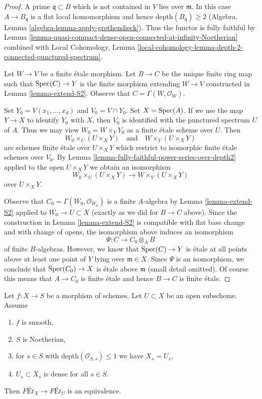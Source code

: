\begin{proof}
A prime $\mathfrak q \subset B$ which is not contained in $V$
lies over $\mathfrak m$. In this case $A \to B_\mathfrak q$
is a flat local homomorphism and hence $\text{depth}(B_\mathfrak q) \geq 2$
(Algebra, Lemma \ref{algebra-lemma-apply-grothendieck}).
Thus the functor is fully faithful by
Lemma \ref{lemma-quasi-compact-dense-open-connected-at-infinity-Noetherian}
combined with Local Cohomology,
Lemma \ref{local-cohomology-lemma-depth-2-connected-punctured-spectrum}.

\medskip\noindent
Let $W \to V$ be a finite \'etale morphism. Let $B \to C$ be the unique finite
ring map such that $\mathop{\mathrm{Spec}}(C) \to Y$ is the finite morphism extending
$W \to V$ constructed in Lemma \ref{lemma-extend-S2}.
Observe that $C = \Gamma(W, \mathcal{O}_W)$.

\medskip\noindent
Set $Y_0 = V(x_1, \ldots, x_d)$ and $V_0 = V \cap Y_0$. Set $X = \mathop{\mathrm{Spec}}(A)$.
If we use the map $Y \to X$ to identify $Y_0$ with $X$,
then $V_0$ is identified with the punctured spectrum $U$ of $A$.
Thus we may view $W_0 = W \times_Y Y_0$ as a finite \'etale scheme
over $U$. Then
$$
W_0 \times_U (U \times_X Y)
\quad\text{and}\quad
W \times_V (U \times_X Y)
$$
are schemes finite \'etale over $U \times_X Y$ which restrict to
isomorphic finite \'etale schemes over $V_0$. By
Lemma \ref{lemma-fully-faithful-power-series-over-depth2}
applied to the open $U \times_X Y$ we obtain an isomorphism
$$
W_0 \times_U (U \times_X Y) \longrightarrow W \times_V (U \times_X Y)
$$
over $U \times_X Y$.

\medskip\noindent
Observe that $C_0 = \Gamma(W_0, \mathcal{O}_{W_0})$ is a finite $A$-algebra
by Lemma \ref{lemma-extend-S2} applied to $W_0 \to U \subset X$ (exactly
as we did for $B \to C$ above). Since the construction in
Lemma \ref{lemma-extend-S2} is compatible with flat base change
and with change of opens, the isomorphism above induces
an isomorphism
$$
\Psi : C \longrightarrow C_0 \otimes_A B
$$
of finite $B$-algebras. However, we know that $\mathop{\mathrm{Spec}}(C) \to Y$
is \'etale at all points above at least one point of $Y$ lying
over $\mathfrak m \in X$. Since $\Psi$ is an isomorphism, we
conclude that $\mathop{\mathrm{Spec}}(C_0) \to X$
is \'etale above $\mathfrak m$ (small detail omitted).
Of course this means that $A \to C_0$ is finite
\'etale and hence $B \to C$ is finite \'etale.
\end{proof}

\begin{lemma}
\label{lemma-purity-smooth-over-depth2}
Let $f : X \to S$ be a morphism of schemes. Let $U \subset X$
be an open subscheme. Assume
\begin{enumerate}
\item $f$ is smooth,
\item $S$ is Noetherian,
\item for $s \in S$ with $\text{depth}(\mathcal{O}_{S, s}) \leq 1$
we have $X_s = U_s$,
\item $U_s \subset X_s$ is dense for all $s \in S$.
\end{enumerate}
Then $\textit{F\'Et}_X \to \textit{F\'Et}_U$ is an equivalence.
\end{lemma}

